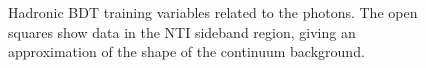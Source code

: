 \begin{figure}[htbp]
  \centering
  \caption{Hadronic BDT training variables related to the photons.  The open squares show data in the NTI sideband region, giving an approximation of the shape of the continuum background. }
  \label{fig:hadvbls1}
\end{figure}

